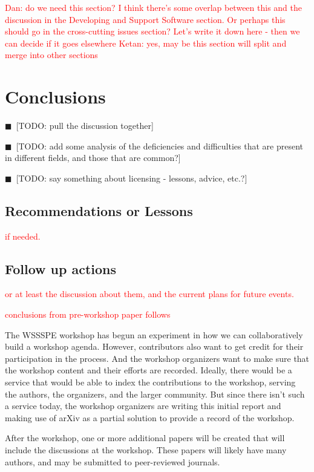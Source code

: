 \documentclass[11pt, oneside]{amsart}
\newcommand{\todo}[1]{{\color{blue}$\blacksquare$~\textsf{[TODO: #1]}}}
\newcommand{\note}[1]{ {\textcolor{red}    { #1 }}}
\begin{document}
\note{Dan: do we need this section?  I think there's some overlap
  between this and the discussion in the Developing and Support
  Software section.  Or perhaps this should go in the cross-cutting
  issues section?  Let's write it down here - then we can decide if it goes elsewhere}
\note{Ketan: yes, may be this section will split and merge into other sections}

\section{Conclusions} \label{sec:conclusions}


\todo{pull the discussion together}

\todo{add some analysis of the deficiencies and difficulties that are
  present in different fields, and those that are common?}

\todo{say something about licensing - lessons, advice, etc.?}

\subsection{Recommendations or Lessons}

\note{if needed.}

\subsection{Follow up actions}

\note{or at least the discussion about them, and the current plans for
  future events.}

\note{conclusions from pre-workshop paper follows}

The WSSSPE workshop has begun an experiment in how we can
collaboratively build a workshop agenda. However, contributors also
want to get credit for their participation in the process. And the
workshop organizers want to make sure that the workshop content and
their efforts are recorded.  Ideally, there would be a service that
would be able to index the contributions to the workshop, serving the
authors, the organizers, and the larger community. But since there
isn't such a service today, the workshop organizers are writing this
initial report and making use of arXiv as a partial solution to
provide a record of the workshop.

After the workshop, one or more additional papers will be created that
will include the discussions at the workshop. These papers will likely
have many authors, and may be submitted to peer-reviewed journals.
\end{document}
